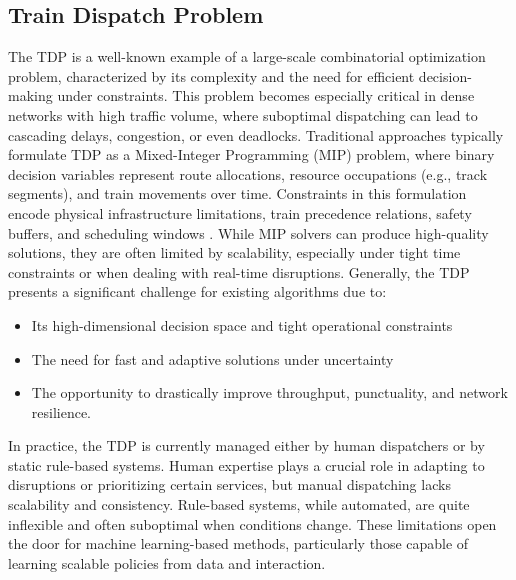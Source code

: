 \documentclass[runningheads]{llncs}
\begin{document}
\subsection{Train Dispatch Problem}
\label{sss:train}
The TDP is a well-known example of a large-scale combinatorial optimization problem, characterized by its complexity and the need for efficient decision-making under constraints. 
This problem becomes especially critical in dense networks with high traffic volume, where suboptimal dispatching can lead to cascading delays, congestion, or even deadlocks.
Traditional approaches typically formulate TDP as a Mixed-Integer Programming (MIP) problem, where binary decision variables represent route allocations, resource occupations (e.g., track segments), and train movements over time. 
Constraints in this formulation encode physical infrastructure limitations, train precedence relations, safety buffers, and scheduling windows \cite{train:LAMORGESE2013559}. 
While MIP solvers can produce high-quality solutions, they are often limited by scalability, especially under tight time constraints or when dealing with real-time disruptions.
Generally, the TDP presents a significant challenge for existing algorithms due to: \begin{itemize} \item Its high-dimensional decision space and tight operational constraints \item The need for fast and adaptive solutions under uncertainty \item The opportunity to drastically improve throughput, punctuality, and network resilience. \end{itemize}

In practice, the TDP is currently managed either by human dispatchers or by static rule-based systems. 
Human expertise plays a crucial role in adapting to disruptions or prioritizing certain services, but manual dispatching lacks scalability and consistency. 
Rule-based systems, while automated, are quite inflexible and often suboptimal when conditions change. 
These limitations open the door for machine learning-based methods, particularly those capable of learning scalable policies from data and interaction.
\end{document}
